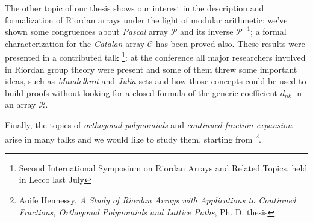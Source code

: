  The other topic of
our thesis shows our interest in the description and formalization of Riordan
arrays under the light of modular arithmetic: we've shown some congruences
about \emph{Pascal} array $\mathcal{P}$ and its inverse $\mathcal{P}^{-1}$; a
formal characterization for the \emph{Catalan} array $\mathcal{C}$ has been
proved also. These results were presented in a contributed talk
\footnote{Second International Symposium on Riordan Arrays and Related Topics,
held in Lecco last July}: at the conference all major researchers involved in
Riordan group theory were present and some of them threw some important ideas,
such as \emph{Mandelbrot} and \emph{Julia} sets and how those concepts could be
used to build proofs without looking for a closed formula of the generic
coefficient $d_{nk}$ in an array $\mathcal{R}$.  

Finally, the topics of \emph{orthogonal polynomials} and
\emph{continued fraction expansion} arise in many talks and we would like to
study them, starting from \footnote{Aoife Hennessy, \emph{A Study of
Riordan Arrays with Applications to Continued Fractions, Orthogonal Polynomials
and Lattice Paths}, Ph.  D.  thesis}.

